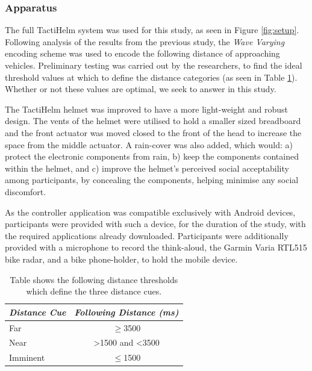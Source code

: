 \documentclass{mpaper}
\begin{document}
\subsubsection{Apparatus}
The full TactiHelm system was used for this study, as seen in Figure \ref{fig:setup}. Following analysis of the results from the previous study, the \textit{Wave Varying} encoding scheme was used to encode the following distance of approaching vehicles. Preliminary testing was carried out by the researchers, to find the ideal threshold values at which to define the distance categories (as seen in Table \ref{tab:fd-thresholds}). Whether or not these values are optimal, we seek to answer in this study.

The TactiHelm helmet was improved to have a more light-weight and robust design. The vents of the helmet were utilised to hold a smaller sized breadboard and the front actuator was moved closed to the front of the head to increase the space from the middle actuator. A rain-cover was also added, which would: a) protect the electronic components from rain, b) keep the components contained within the helmet, and c) improve the helmet's perceived social acceptability among participants, by concealing the components, helping minimise any social discomfort.

As the controller application was compatible exclusively with Android devices, participants were provided with such a device, for the duration of the study, with the required applications already downloaded. Participants were additionally provided with a microphone to record the think-aloud, the Garmin Varia RTL515 bike radar, and a bike phone-holder, to hold the mobile device.

\vspace{.15cm}
\begin{table}[h]
    \centering
    \begin{tabular}{l|c}
        \emph{Distance Cue} & \emph{Following Distance (ms)} \\ \hline
        Far & $\geq$3500 \\ 
        Near & >1500 and <3500 \\ 
        Imminent & $\leq$1500  \\ 
    \end{tabular}
    \caption{Table shows the following distance thresholds which define the three distance cues.}
    \label{tab:fd-thresholds}
\end{table}
\end{document}
